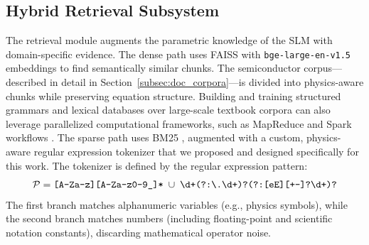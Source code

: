 \documentclass[a4paper,fleqn]{cas-sc}
\begin{document}
\subsection{Hybrid Retrieval Subsystem}
\label{subsec:retrieval}
The retrieval module augments the parametric knowledge of the SLM with domain-specific evidence. The dense path uses FAISS \citep{FAISS-Johnson} with \texttt{bge-large-en-v1.5} embeddings \citep{BGE-Xiao} to find semantically similar chunks. The semiconductor corpus---described in detail in Section~\ref{subsec:doc_corpora}---is divided into physics-aware chunks while preserving equation structure. Building and training structured grammars and lexical databases over large-scale textbook corpora can also leverage parallelized computational frameworks, such as MapReduce and Spark workflows \citep{Amrita-Author-2016}. The sparse path uses BM25 \citep{BM25-Robertson}, augmented with a custom, physics-aware regular expression tokenizer that we proposed and designed specifically for this work. The tokenizer is defined by the regular expression pattern:
\begin{equation*}
\mathcal{P} = \verb|[A-Za-z][A-Za-z0-9_]*| \;\cup\; \verb|\d+(?:\.\d+)?(?:[eE][+-]?\d+)?|
\end{equation*}
The first branch matches alphanumeric variables (e.g., physics symbols), while the second branch matches numbers (including floating-point and scientific notation constants), discarding mathematical operator noise.
\end{document}
